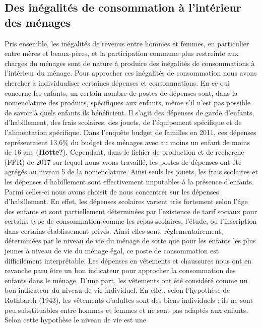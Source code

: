 \documentclass[
  12pt,
]{book}
\begin{document}
\subsection{Des inégalités de consommation à l'intérieur des
ménages}\label{des-inuxe9galituxe9s-de-consommation-uxe0-lintuxe9rieur-des-muxe9nages}

Pris ensemble, les inégalités de revenus entre hommes et femmes, en
particulier entre mères et beaux-pères, et la participation commune plus
restreinte aux charges du ménages sont de nature à produire des
inégalités de consommations à l'intérieur du ménage. Pour approcher ces
inégalités de consommation nous avons chercher à individualiser
certaines dépenses et consommations. En ce qui concerne les enfants, un
certain nombre de postes de dépenses sont, dans la nomenclature des
produits, spécifiques aux enfants, même s'il n'est pas possible de
savoir à quels enfants ils bénéficient. Il s'agit des dépenses de garde
d'enfants, d'habillement, des frais scolaires, des jouets, de
l'équipement spécifique et de l'alimentation spécifique. Dans l'enquête
budget de familles en 2011, ces dépenses représentaient 13,6\% du budget
des ménages avec au moins un enfant de moins de 16 ans
(\textbf{Hotte?}). Cependant, dans le fichier de production et de
recherche (FPR) de 2017 sur lequel nous avons travaillé, les postes de
dépenses ont été agrégés au niveau 5 de la nomenclature. Ainsi seuls les
jouets, les frais scolaires et les dépenses d'habillement sont
effectivement imputables à la présence d'enfants. Parmi celles-ci nous
avons choisit de nous concentrer sur les dépenses d'habillement. En
effet, les dépenses scolaires varient très fortement selon l'âge des
enfants et sont partiellement déterminées par l'existence de tarif
sociaux pour certains type de consommation comme les repas scolaires,
l'étude, ou l'inscription dans certains établissement privés. Ainsi
elles sont, réglementairement, déterminées par le niveau de vie du
ménage de sorte que pour les enfants les plus jeunes à niveau de vie du
ménage égal, ce poste de consommation est difficilement interprétable.
Les dépenses en vêtements et chaussures nous ont en revanche paru être
un bon indicateur pour approcher la consommation des enfants dans le
ménage. D'une part, les vêtements ont été considéré comme un bon
indicateur du niveau de vie individuel. En effet, selon l'hypothèse de
Rothbarth (1943), les vêtements d'adultes sont des biens individuels :
ils ne sont peu substituables entre hommes et femmes et ne sont pas
adaptés aux enfants. Selon cette hypothèse le niveau de vie est une
\end{document}
